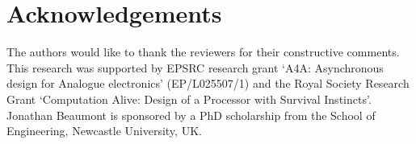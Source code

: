 \documentclass[british, journal]{IEEEtran}
\begin{document}

\section*{Acknowledgements}


The authors would like to thank the reviewers for their constructive
comments. This research was supported by EPSRC research grant `A4A:
Asynchronous design for Analogue electronics' (EP/L025507/1) and
the Royal Society Research Grant `Computation Alive: Design of a
Processor with Survival Instincts'. Jonathan Beaumont is sponsored
by a PhD scholarship from the School of Engineering, Newcastle University, UK.




\end{document}
